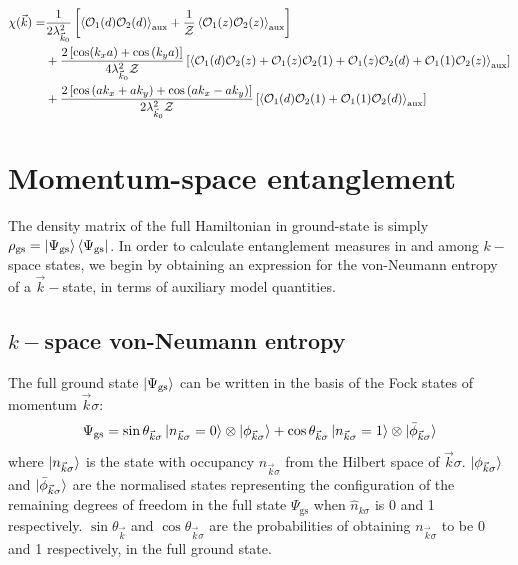 \documentclass[reprint,hidelinks]{revtex4-2}
\begin{document}
\begin{equation}\begin{aligned}
	\chi(\vec k)=& \frac{1}{2\lambda_{\vec k_0}^2}\left[\braket{\mathcal{O}_1(d) \mathcal{O}_2(d)}_\text{aux} + \frac{1}{\mathcal{Z}}\braket{\mathcal{O}_1(z) \mathcal{O}_2(z)}_\text{aux}\right]\\
		    &+ \frac{2\left[\cos(k_x a) + \cos\left(k_y a\right)\right]}{4\lambda_{\vec k_0}^2 \mathcal{Z}}\left[\braket{\mathcal{O}_1(d) \mathcal{O}_2(z) + \mathcal{O}_1(z) \mathcal{O}_2(1) + \mathcal{O}_1(z) \mathcal{O}_2(d) + \mathcal{O}_1(1) \mathcal{O}_2(z)}_\text{aux}\right] \\
		    &+ \frac{2\left[\cos \left(ak_x + ak_y\right) + \cos \left( ak_x - ak_y \right) \right]}{2\lambda_{\vec k_0}^2 \mathcal{Z}}\left[\braket{\mathcal{O}_1(d) \mathcal{O}_2(1) + \mathcal{O}_1(1) \mathcal{O}_2(d)}_\text{aux}\right] 
\end{aligned}\end{equation}

\section{Momentum-space entanglement}
The density matrix of the full Hamiltonian in ground-state is simply \(\rho_\text{gs} = \ket{\Psi_\text{gs}}\bra{\Psi_\text{gs}}\). In order to calculate entanglement measures in and among \(k-\)space states, we begin by obtaining an expression for the von-Neumann entropy of a \(\vec k-\)state, in terms of auxiliary model quantities.

\subsection{\(k-\)space von-Neumann entropy}
The full ground state \(\ket{\Psi_\text{gs}}\) can be written in the basis of the Fock states of momentum \(\vec k\sigma\):
\begin{equation}\begin{aligned}
	\Psi_\text{gs} = \sin\theta_{\vec k\sigma} \ket{n_{\vec k\sigma} = 0}\otimes\ket{\phi_{\vec k\sigma}} + \cos\theta_{\vec k\sigma} \ket{n_{\vec k\sigma} = 1}\otimes\ket{\bar\phi_{\vec k\sigma}}
\end{aligned}\end{equation}
where \(\ket{n_{\vec k\sigma}}\) is the state with occupancy \(n_{\vec k\sigma}\) from the Hilbert space of \(\vec k\sigma\). \(\ket{\phi_{\vec k\sigma}}\) and \(\ket{\bar\phi_{\vec k\sigma}}\) are the normalised states representing the configuration of the remaining degrees of freedom in the full state \(\Psi_\text{gs}\) when \(\hat n_{k\sigma}\) is 0 and 1 respectively. \(\sin \theta_{\vec k}\) and \(\cos\theta_{\vec k\sigma}\) are the probabilities of obtaining \(n_{\vec k\sigma}\) to be 0 and 1 respectively, in the full ground state.
\end{document}
